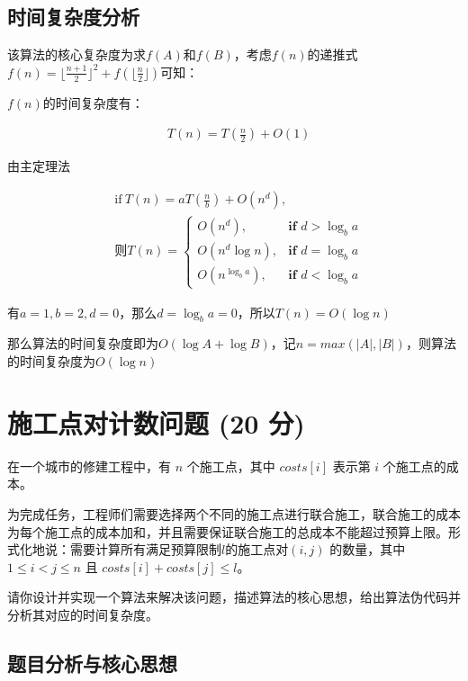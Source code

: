 \documentclass{article}
\begin{document}
\subsection{时间复杂度分析}

该算法的核心复杂度为求$f(A)$和$f(B)$，考虑$f(n)$的递推式$f(n)=\lfloor \frac{n+1}{2} \rfloor^2+f(\lfloor \frac{n}{2} \rfloor)$可知：

$f(n)$的时间复杂度有：

\begin{align*}   
    &T(n) = T(\frac{n}{2}) + O(1)
\end{align*}

由主定理法

\begin{align*}
    &\text{if}\  T(n) = a T(\frac{n}{b}) + O(n^d),\\
    &则T(n) = 
    \begin{cases}
        O(n^d), & \textbf{if } d > \log_ba\\
        O(n^d\log n),& \textbf{if } d = \log_ba\\
        O(n^{\log_ba}), & \textbf{if } d < \log_ba
    \end{cases}
\end{align*}

有$a = 1, b=2, d = 0$，那么$d = \log_b a = 0$，所以$T(n) = O(\log n)$

那么算法的时间复杂度即为$O(\log A + \log B)$，记$n = max(|A|, |B|)$，则算法的时间复杂度为$O(\log n)$


\section{施工点对计数问题 (20 分)}

在一个城市的修建工程中，有 $n$ 个施工点，其中 $costs[i]$ 表示第 $i$ 个施工点的成本。

为完成任务，工程师们需要选择两个不同的施工点进行联合施工，联合施工的成本为每个施工点的成本加和，并且需要保证联合施工的总成本不能超过预算上限。形式化地说：需要计算所有满足预算限制$ l $的施工点对$ (i, j)$ 的数量，其中$ 1 \le i < j \le n$ 且 $costs[i] + costs[j] \le l$。

请你设计并实现一个算法来解决该问题，描述算法的核心思想，给出算法伪代码并分析其对应的时间复杂度。

\subsection{题目分析与核心思想}
\end{document}
